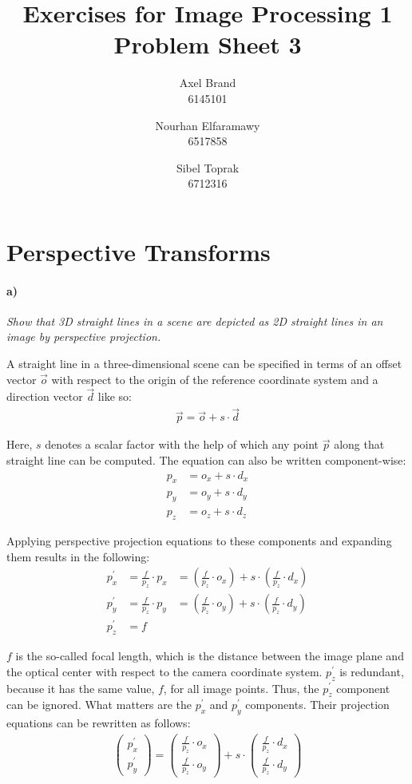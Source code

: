 \documentclass[a4paper,twocolumn]{article}
\title{\textbf{Exercises for Image Processing 1}\\Problem Sheet 3}
\author{Axel Brand\\6145101 \and Nourhan Elfaramawy\\6517858 \and Sibel Toprak\\6712316}
\newcommand{\subtask}[2]{\paragraph{#1)} \textit{#2} \newline}
\begin{document}
	\maketitle
	
	\section{Perspective Transforms}
	
	\subtask{a}{Show that 3D straight lines in a scene are depicted as 2D straight lines in an image by perspective projection.}
	
	A straight line in a three-dimensional scene can be specified in terms of an offset vector $\vec{o}$  with respect to the origin of the reference coordinate system and a direction vector $\vec{d}$ like so:
	\begin{align*}
		\vec{p} = \vec{o} + s \cdot \vec{d}
	\end{align*}
	
	Here, $s$ denotes a scalar factor with the help of which any point $\vec{p}$ along that straight line can be computed. The equation can also be written component-wise:
	\begin{align*}
		p_x &= o_x + s \cdot d_x \\
		p_y &= o_y + s \cdot d_y \\
		p_z &= o_z + s \cdot d_z
	\end{align*}
	
	Applying perspective projection equations to these components and expanding them results in the following:
	\begin{align*}
		p_{x}^{\prime} &= \frac{f}{p_{z}} \cdot p_{x} 
		&= (\frac{f}{p_{z}} \cdot o_x) + s \cdot (\frac{f}{p_{z}} \cdot d_x) \\
		p_{y}^{\prime} &= \frac{f}{p_{z}} \cdot p_{y}
		&= (\frac{f}{p_{z}} \cdot o_y) + s \cdot (\frac{f}{p_{z}} \cdot d_y) \\
		p_{z}^{\prime} &= f
	\end{align*}
	
	$f$ is the so-called focal length, which is the distance between the image plane and the optical center with respect to the camera coordinate system. $p_{z}^{\prime}$ is redundant, because it has the same value, $f$, for all image points. Thus, the $p_{z}^{\prime}$ component can be ignored. What matters are the $p_{x}^{\prime}$ and $p_{y}^{\prime}$ components. Their projection equations can be rewritten as follows:
	\begin{align*}
		\begin{pmatrix}
		p_{x}^{\prime} \\
		p_{y}^{\prime}
		\end{pmatrix}
		=
		\begin{pmatrix}
		\frac{f}{p_{z}} \cdot o_x \\
		\frac{f}{p_{z}} \cdot o_y
		\end{pmatrix}
		+ s \cdot
		\begin{pmatrix}
		\frac{f}{p_{z}} \cdot d_x \\
		\frac{f}{p_{z}} \cdot d_y
		\end{pmatrix}
	\end{align*}
	
\end{document}
